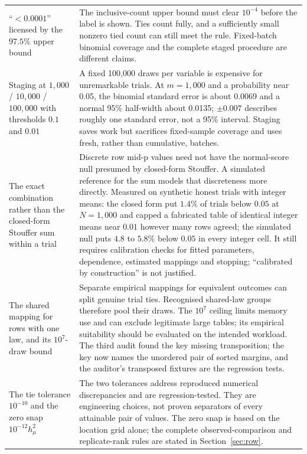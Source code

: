\documentclass[11pt,a4paper]{article}
\begin{document}
\begin{longtable}{>{\raggedright\arraybackslash}p{} >{\raggedright\arraybackslash}p{}}
\addlinespace
``$<0.0001$'' licensed by the $97.5\%$ upper bound &
The inclusive-count upper bound must clear $10^{-4}$ before the label is shown. Ties count fully, and a sufficiently small nonzero tied count can still meet the rule. Fixed-batch binomial coverage and the complete staged procedure are different claims. \\
\addlinespace
Staging at $1{,}000$ / $10{,}000$ / $100{,}000$ with thresholds $0.1$ and $0.01$ &
A fixed 100,000 draws per variable is expensive for unremarkable trials. At $m=1,000$ and a probability near 0.05, the binomial standard error is about 0.0069 and a normal 95\% half-width about 0.0135; $\pm0.007$ describes roughly one standard error, not a 95\% interval. Staging saves work but sacrifices fixed-sample coverage and uses fresh, rather than cumulative, batches. \\
\addlinespace
The exact combination rather than the closed-form Stouffer sum within a trial &
Discrete row mid-p values need not have the normal-score null presumed by closed-form Stouffer. A simulated reference for the sum models that discreteness more directly. Measured on synthetic honest trials with integer means: the closed form put $1.4\%$ of trials below $0.05$ at $N=1{,}000$ and capped a fabricated table of identical integer means near $0.01$ however many rows agreed; the simulated null puts $4.8$ to $5.8\%$ below $0.05$ in every integer cell. It still requires calibration checks for fitted parameters, dependence, estimated mappings and stopping; ``calibrated by construction'' is not justified. \\
\addlinespace
The shared mapping for rows with one law, and its $10^7$-draw bound &
Separate empirical mappings for equivalent outcomes can split genuine trial ties. Recognised shared-law groups therefore pool their draws. The $10^7$ ceiling limits memory use and can exclude legitimate large tables; its empirical suitability should be evaluated on the intended workload. The third audit found the key missing transposition; the key now names the unordered pair of sorted margins, and the auditor's transposed fixtures are the regression tests. \\
\addlinespace
The tie tolerance $10^{-10}$ and the zero snap $10^{-12}h_\mu^2$ &
The two tolerances address reproduced numerical discrepancies and are regression-tested. They are engineering choices, not proven separators of every attainable pair of values. The zero snap is based on the location grid alone; the complete observed-comparison and replicate-rank rules are stated in Section~\ref{sec:row}. \\

\end{longtable}
\end{document}

